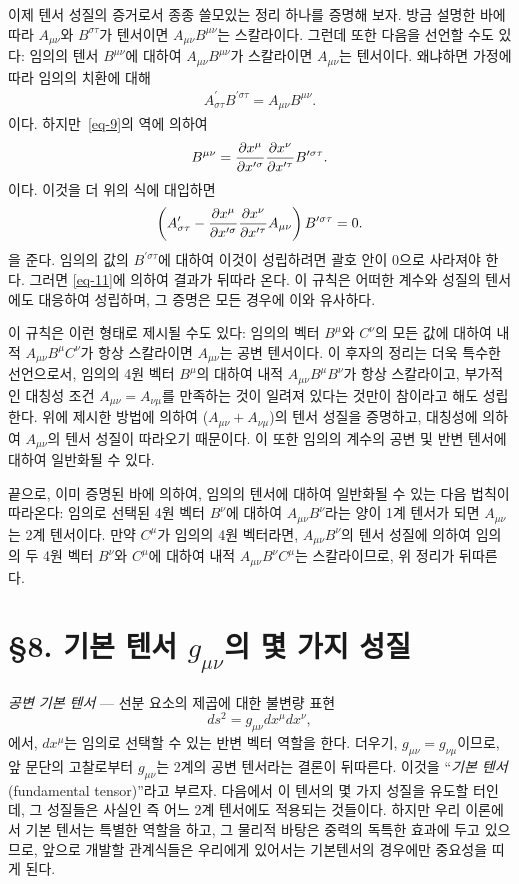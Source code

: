 이제 텐서 성질의 증거로서 종종 쓸모있는 정리 하나를 증명해 보자. 방금 설명한 바에 따라 
$A_{\mu\nu}$와 $B^{\sigma\tau}$가 텐서이면 $A_{\mu\nu}B^{\mu\nu}$는 스칼라이다. 그런데 또한 다음을 선언할 수도 있다: 임의의 텐서 $B^{\mu\nu}$에 대하여  $A_{\mu\nu}B^{\mu\nu}$가 스칼라이면 $A_{\mu\nu}$는 텐서이다. 왜냐하면 가정에 따라 임의의 치환에 대해
\begin{align*}
	A_{\sigma\tau}^\prime B^{\prime\sigma\tau}=A_{\mu\nu}B^{\mu\nu}.
\end{align*}이다.
하지만~\eqref{eq-9}의 역에 의하여
\begin{equation*}
	B^{\mu\nu}={\frac{{\partial}{x^\mu}}{{\partial}{x^{\prime\sigma}}}}{\frac{{\partial}{x^\nu}}{{\partial}{x^{\prime\tau}}}} B^{\prime\sigma\tau}.
\end{equation*}이다. 이것을 더 위의 식에 대입하면
\begin{equation*}
	\left(A_{\sigma\tau}^\prime - {\frac{{\partial}{x^\mu}}{{\partial}{x^{\prime\sigma}}}}{\frac{{\partial}{x^\nu}}{{\partial}{x^{\prime\tau}}}} A_{\mu\nu} \right) B^{\prime\sigma\tau}=0.
\end{equation*}을 준다. 임의의 값의 $B^{\prime\sigma\tau}$에 대하여 이것이 성립하려면 괄호 안이 0으로 사라져야 한다.
그러면 \eqref{eq-11}에 의하여 결과가 뒤따라 온다. 이 규칙은 어떠한 계수와 성질의 텐서에도 대응하여 성립하며, 그 증명은 모든 경우에 이와 유사하다.

이 규칙은 이런 형태로 제시될 수도 있다: 
임의의 벡터 $B^{\mu}$와 $C^\nu$의 모든 값에 대하여 내적 $A_{\mu\nu} B^\mu C^\nu$가 항상 스칼라이면 $A_{\mu\nu}$는 공변 텐서이다. 이 후자의 정리는 더욱 특수한 선언으로서, 임의의 4원 벡터 $B^\mu$의 대하여 내적 $A_{\mu\nu} B^\mu B^\nu$가 항상 스칼라이고, 부가적인 대칭성 조건 $A_{\mu\nu}=A_{\nu\mu}$를 만족하는 것이 일려져 있다는 것만이 참이라고 해도 성립한다. 위에 제시한 방법에 의하여 ($A_{\mu\nu}+A_{\nu\mu}$)의 텐서 성질을 증명하고, 대칭성에 의하여 $A_{\mu\nu}$의 텐서 성질이 따라오기 때문이다. 이 또한 임의의 계수의 공변 및 반변 텐서에 대하여 일반화될 수 있다.

끝으로, 이미 증명된 바에 의하여, 임의의 텐서에 대하여 일반화될 수 있는 다음 법칙이 따라온다: 임의로 선택된 4원 벡터 $B^\nu$에 대하여 $A_{\mu\nu} B^\nu$라는 양이 1계 텐서가 되면 $A_{\mu\nu}$는 2계 텐서이다. 만약 $C^\mu$가 임의의 4원 벡터라면, $A_{\mu\nu} B^\nu$의 텐서 성질에 의하여 임의의 두 4원 벡터 $B^\nu$와 $C^\mu$에 대하여 내적 $A_{\mu\nu} B^\nu C^\mu$는 스칼라이므로, 위 정리가 뒤따른다. 

\section*{\S 8. 기본 텐서 $g_{\mu\nu}$의 몇 가지 성질}
\emph{공변 기본 텐서} --- 
선분 요소의 제곱에 대한 불변량 표현 
\[ds^2 = g_{\mu\nu}dx^\mu dx^\nu ,\]
에서, $dx^\mu$는 임의로 선택할 수 있는 반변 벡터 역할을 한다. 더우기, $g_{\mu\nu}=g_{\nu\mu}$이므로, 앞 문단의 고찰로부터 $g_{\mu\nu}$는 2계의 공변 텐서라는 결론이 뒤따른다.  이것을 ``\emph{기본 텐서}(fundamental tensor)''라고 부르자. 다음에서 이 텐서의 몇 가지 성질을 유도할 터인데, 그 성질들은 사실인 즉 어느 2계 텐서에도 적용되는 것들이다. 하지만 우리 이론에서 기본 텐서는 특별한 역할을 하고, 그 물리적 바탕은 중력의 독특한 효과에 두고 있으므로, 앞으로 개발할 관계식들은 우리에게 있어서는 기본텐서의 경우에만 중요성을 띠게 된다.

